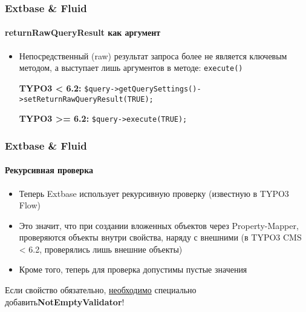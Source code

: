 
\begin{frame}[fragile]
	\frametitle{Extbase \& Fluid}
	\framesubtitle{returnRawQueryResult как аргумент}

	\lstset{
		basicstyle=\smaller\ttfamily
	}

	\begin{itemize}
		\item Непосредственный (raw) результат запроса более не является ключевым методом,\newline
			а выступает лишь аргументов в методе: \texttt{execute()}
			\newline

			\smaller\textbf{TYPO3 < 6.2:}\normalsize\newline
			\lstinline!$query->getQuerySettings()->setReturnRawQueryResult(TRUE);!
			\newline

			\smaller\textbf{TYPO3 >= 6.2:}\normalsize\newline
			\lstinline!$query->execute(TRUE);!

	\end{itemize}

\end{frame}


\begin{frame}[fragile]
	\frametitle{Extbase \& Fluid}
	\framesubtitle{Рекурсивная проверка}

	\begin{itemize}
		\item Теперь Extbase использует рекурсивную проверку (известную в TYPO3 Flow)
		\item Это значит, что при создании вложенных объектов через Property-Mapper,
			проверяются объекты внутри свойства, наряду с внешними\newline
			(в TYPO3 CMS < 6.2, проверялись лишь внешние объекты)
		\item Кроме того, теперь для проверка допустимы пустые значения
	\end{itemize}

	\breakingchange

	\smaller\begin{center} Если свойство обязательно, \underline{необходимо} специально добавить\textbf{NotEmptyValidator}!\end{center}\normalsize

\end{frame}

